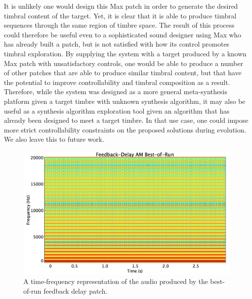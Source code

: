 \documentclass[12pt]{report} 	%
\numberwithin{figure}{chapter}
\numberwithin{table}{chapter}
\numberwithin{equation}{chapter}
\begin{document}
\begin{flushleft}
It is unlikely one would design this Max patch in order to generate the desired timbral content of the target. Yet, it is clear that it is able to produce timbral sequences through the same region of timbre space. The result of this process could therefore be useful even to a sophisticated sound designer using Max who has already built a patch, but is not satisfied with how its control promotes timbral exploration. By supplying the system with a target produced by a known Max patch with unsatisfactory controls, one would be able to produce a number of other patches that are able to produce similar timbral content, but that have the potential to improve controllability and timbral composition as a result. Therefore, while the system was designed as a more general meta-synthesis platform given a target timbre with unknown synthesis algorithm, it may also be useful as a synthesis algorithm exploration tool given an algorithm that has already been designed to meet a target timbre. In that use case, one could impose more strict controllability constraints on the proposed solutions during evolution. We also leave this to future work.\clearpage
\begin{figure}[h!]
\begin{center}
\includegraphics[scale=0.35,width=\linewidth]{FeedbackDelayAMBestOfRunSTFT}
\caption[Best-of-run feedback delay time-frequency representation]{A time-frequency representation of the audio produced by the best-of-run feedback delay patch.}
\end{center}
\end{figure}

\end{flushleft}
\end{document}

